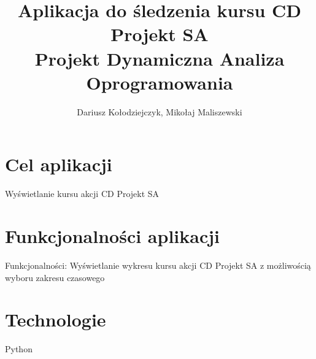 \documentclass{article}
\begin{document}
		\title{Aplikacja do śledzenia kursu CD Projekt SA \\ Projekt Dynamiczna Analiza Oprogramowania}
	\author{Dariusz Kołodziejczyk, Mikołaj Maliszewski}
	\maketitle
	\section{Cel aplikacji}
	Wyświetlanie kursu akcji CD Projekt SA 
	\section{Funkcjonalności aplikacji}
	Funkcjonalności: Wyświetlanie wykresu kursu akcji CD Projekt SA z możliwością wyboru zakresu czasowego
	\section{Technologie}
	Python
	
\end{document}
